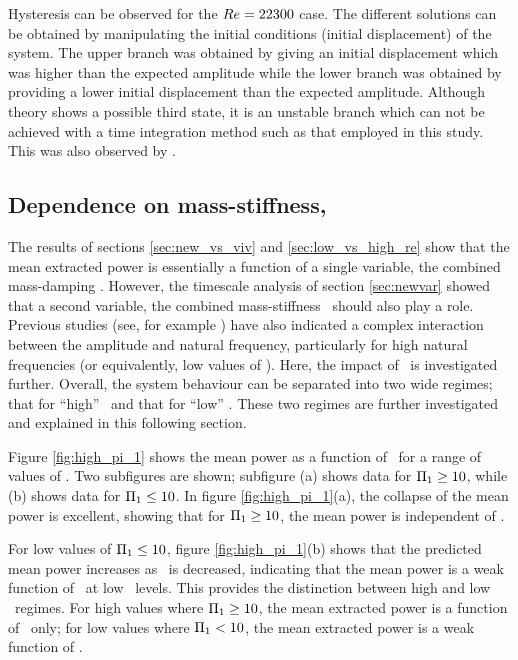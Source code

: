 

Hysteresis can be observed for the $Re = 22300$ case. The different solutions can be obtained by manipulating the initial conditions (initial displacement) of the system. The upper branch was obtained by giving an initial displacement which was higher than the expected amplitude while the lower branch was obtained by providing a lower initial displacement than the expected amplitude. Although theory shows a possible third state, it is an unstable branch which can not be achieved with a time integration method such as that employed in this study. This was also observed by \cite{Vio2007}.


\subsection{Dependence on mass-stiffness, \massstiff}
\label{subsec:dependence pi_1}

The results of sections \ref{sec:new_vs_viv} and \ref{sec:low_vs_high_re} show that the mean extracted power is essentially a function of a single variable, the combined mass-damping \massdamp. However, the timescale analysis of section \ref{sec:newvar} showed that a second variable, the combined mass-stiffness \massstiff\ should also play a role. Previous studies (see, for example \citet{bouclin:77}) have also indicated a complex interaction between the amplitude and natural frequency, particularly for high natural frequencies (or equivalently, low values of \massstiff). Here, the impact of \massstiff\ is investigated further. Overall, the system behaviour can be separated into two wide regimes; that for ``high'' \massstiff\ and that for ``low'' \massstiff. These two regimes are further investigated and explained in this following section.

Figure \ref{fig:high_pi_1} shows the mean power as a function of \massdamp\ for a range of values of \massstiff. Two subfigures are shown; subfigure (a) shows data for $\Pi_1 \geq 10$, while (b) shows data for $\Pi_1 \leq 10$. In figure \ref{fig:high_pi_1}(a), the collapse of the mean power is excellent, showing that for $\Pi_1 \geq 10$, the mean power is independent of \massstiff.



For low values of $\Pi_1 \leq 10$, figure \ref{fig:high_pi_1}(b) shows that the predicted mean power increases as \massstiff\ is decreased, indicating that the mean power is a weak function of \massstiff\ at low \massstiff\ levels. This provides the distinction between high and low \massstiff\ regimes. For high values where $\Pi_1 \geq 10$, the mean extracted power is a function of \massdamp\ only; for low values where $\Pi_1 < 10$, the mean extracted power is a weak function of \massstiff.

